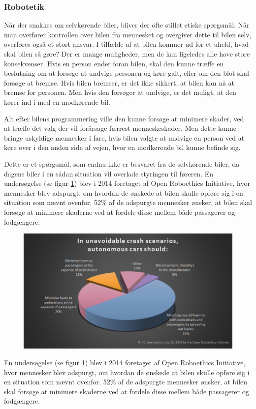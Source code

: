 \subsubsection{Robotetik}
	Når der snakkes om selvkørende biler, bliver der ofte stillet etiske spørgsmål. Når man overfører kontrollen over bilen fra mennesket og overgiver dette til bilen selv, overføres også et stort ansvar. I tilfælde af at bilen kommer ud for et uheld, hvad skal bilen så gøre? Der er mange muligheder, men de kan ligeledes alle have store konsekvenser. Hvis en person ender foran bilen, skal den kunne træffe en beslutning om at forsøge at undvige personen og køre galt, eller om den blot skal forsøge at bremse. Hvis bilen bremser, er det ikke sikkert, at bilen kan nå at bremse for personen. Men hvis den forsøger at undvige, er det muligt, at den kører ind i med en modkørende bil. 

	Alt efter bilens programmering ville den kunne forsøge at minimere skader, ved at træffe det valg der vil forårsage færrest menneskeskader. Men dette kunne bringe uskyldige mennesker i fare, hvis bilen valgte at undvige en person ved at køre over i den anden side af vejen, hvor en modkørende bil kunne befinde sig. 
	
	Dette er et spørgsmål, som endnu ikke er besvaret fra de selvkørende biler, da dagens biler i en sådan situation vil overlade styringen til føreren. En undersøgelse (se figur \ref{fig:etik_accident}) blev i 2014 foretaget af Open Roboethics Initiative, hvor mennesker blev adspurgt, om hvordan de ønskede at bilen skulle opføre sig i en situation som nævnt ovenfor. 52\% af de adspurgte mennesker ønsker, at bilen skal forsøge at minimere skaderne ved at fordele disse mellem både passagerer og fodgængere. 
	

	\begin{figure}[h!]
		\centering
		\includegraphics[width=\textwidth]{images/roboethics-2.jpg}
		\label{fig:etik_accident}
	\end{figure}
	En undersøgelse (se figur \ref{fig:etik_accident}) blev i 2014 foretaget af Open Roboethics Initiative, hvor mennesker blev adspurgt, om hvordan de ønskede at bilen skulle opføre sig i en situation som nævnt ovenfor. 52\% af de adspurgte mennesker ønsker, at bilen skal forsøge at minimere skaderne ved at fordele disse mellem både passagerer og fodgængere. 

